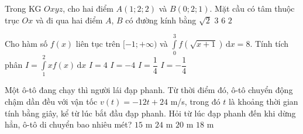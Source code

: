 \begin{ex}%
	Trong KG $Oxyz$, cho hai điểm $A(1;2;2)$ và $B(0;2;1)$. Mặt cầu có tâm thuộc trục $Ox$ và đi qua hai điểm $A$, $B$ có đường kính bằng
	\choice
	{$\sqrt{2}$}
	{$3$}
	{\True $6$}
	{$2$}
\end{ex}
\begin{ex}%
	Cho hàm số $f(x)$ liên tục trên $[-1;+\infty)$ và $\displaystyle\int\limits_0^3f\left(\sqrt{x+1}\right)\mathrm{\,d}x=8$. Tính tích phân $I=\displaystyle\int\limits_1^2xf(x)\mathrm{\,d}x$
	\choice
	{\True $I=4$}
	{$I=-4$}
	{$I=\dfrac{1}{4}$}
	{$I=-\dfrac{1}{4}$}
\end{ex}
\begin{ex}%
	Một ô-tô đang chạy thì người lái đạp phanh. Từ thời điểm đó, ô-tô chuyển động chậm dần đều với vận tốc $v(t)=-12t+24$ m/s, trong đó $t$ là khoảng thời gian tính bằng giây, kể từ lúc bắt đầu đạp phanh. Hỏi từ lúc đạp phanh đến khi dừng hẳn, ô-tô di chuyển bao nhiêu mét?
	\choice
	{$15$ m}
	{\True $24$ m}
	{$20$ m}
	{$18$ m}
\end{ex}
